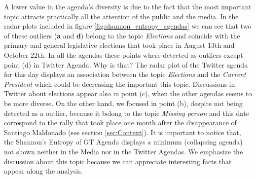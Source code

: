 \documentclass[a4paper, 12pt]{article}
\begin{document}
\par A lower value in the agenda's diversity is due to the fact that the most important topic attracts practically all the attention of the public and the media.
In the radar plots included in figure \ref{fig:shannon_entropy_agendas} we can see that two of these outliers (\textbf{a} and \textbf{d}) belong to the topic \emph{Elections} and coincide with the primary and general legislative elections that took place in August 13th and October 22th. 
In all the agendas these points where detected as outliers except point (d) in Twitter Agenda. Why is that? The radar plot of the Twitter agenda for this day displays an association between the topic \emph{Elections} and the \emph{Current President} which could be decreasing the important this topic.
Discussions in Twitter about elections appear also in point (c), when the other agendas seems to be more diverse. 
On the other hand, we focused in point (b), despite not being detected as a outlier, because it belong to the topic \emph{Missing person} and this date correspond to the rally that took place one month after the disappearance of Santiago Maldonado (see section \ref{sec:Context}). It is important to notice that, the Shannon's Entropy of GT Agenda displays a minimum (collapsing agenda) not shown neither in the Media nor in the Twitter Agendas.
We emphasize the discussion about this topic because we can appreciate  interesting facts that appear along the analysis.
\end{document}
